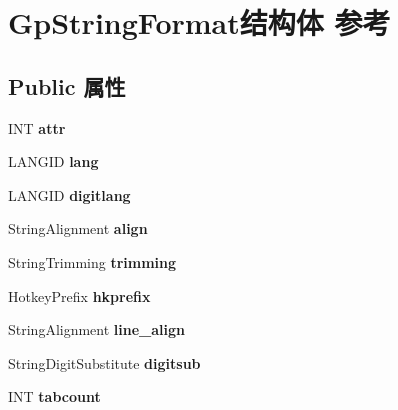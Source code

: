 \hypertarget{struct_gp_string_format}{}\section{Gp\+String\+Format结构体 参考}
\label{struct_gp_string_format}
\subsection*{Public 属性}
\begin{DoxyCompactItemize}
\item 
\mbox{\label{struct_gp_string_format_ade982e888d07fb0c45dce13141d2cf96}} 
I\+NT {\bfseries attr}
\item 
\mbox{\label{struct_gp_string_format_a70c972e192780b7280b90ec1fe01261c}} 
L\+A\+N\+G\+ID {\bfseries lang}
\item 
\mbox{\label{struct_gp_string_format_a290afccb1db33e88e2e15aedf3a50086}} 
L\+A\+N\+G\+ID {\bfseries digitlang}
\item 
\mbox{\label{struct_gp_string_format_a874d7690f4d7843d3deb6dbdb2332bc2}} 
String\+Alignment {\bfseries align}
\item 
\mbox{\label{struct_gp_string_format_a80070802b4abeff41cdadf4d5df529fe}} 
String\+Trimming {\bfseries trimming}
\item 
\mbox{\label{struct_gp_string_format_abd0c459a5cf4811d12bf8294f0a75548}} 
Hotkey\+Prefix {\bfseries hkprefix}
\item 
\mbox{\label{struct_gp_string_format_aea166b7a526e58caf2a18c0700be9596}} 
String\+Alignment {\bfseries line\+\_\+align}
\item 
\mbox{\label{struct_gp_string_format_aa874a6decb2be2fca81cecaef9ed5b76}} 
String\+Digit\+Substitute {\bfseries digitsub}
\item 
\mbox{\label{struct_gp_string_format_ad521af3ff6e56df9b9d1e39d35934ad1}} 
I\+NT {\bfseries tabcount}

\end{DoxyCompactItemize}
